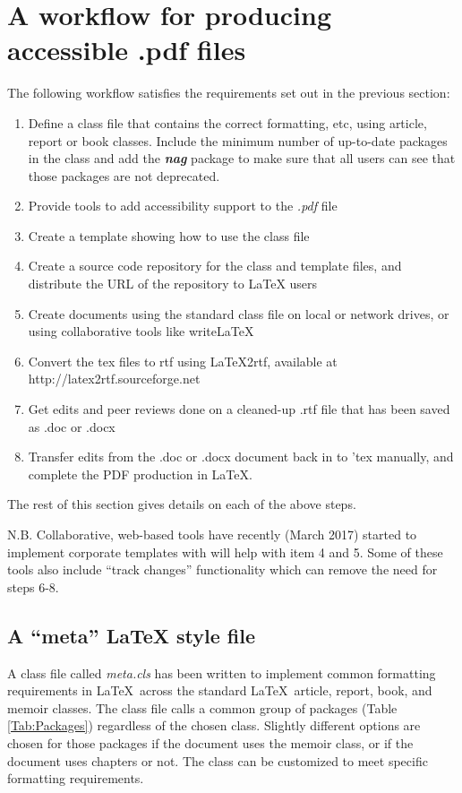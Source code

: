 \documentclass[12pt,letterpaper]{article}
\newcommand{\fn}[1]{\emph{#1}}
\newcommand{\packagename}[1]{\textbf{\emph{#1}}}
\begin{document}
\section{A workflow for producing accessible .pdf files}
The following workflow satisfies the requirements set out in the previous section:
\begin{enumerate}
\item Define a class file that contains the correct formatting, etc, using article, report or book classes. Include the minimum number of up-to-date packages in the class and add the \packagename{nag} package to make sure that all users can see that those packages are not deprecated.
\item Provide tools to add accessibility support to the \fn{.pdf} file
\item Create a template showing how to use the class file
\item Create a source code repository for the class and template files, and distribute the URL of the repository to LaTeX users
\item Create documents using the standard class file on local or network drives, or using collaborative tools like writeLaTeX
\item Convert the tex files to rtf using LaTeX2rtf, available at http://latex2rtf.sourceforge.net
\item Get edits and peer reviews done on a cleaned-up .rtf file that has been saved as .doc or .docx
\item Transfer edits from the .doc or .docx document back in to 'tex manually, and complete the PDF production in LaTeX.
\end{enumerate}

The rest of this section gives details on each of the above steps.

N.B. Collaborative, web-based tools have recently (March 2017) started to implement corporate templates with will help with item 4 and 5. Some of these tools also include ``track changes'' functionality which can remove the need for steps 6-8.

\subsection{A ``meta'' LaTeX style file}\label{sec:meta.cls}
A class file called \fn{meta.cls} has been written to implement common formatting requirements in \LaTeX\ across the standard \LaTeX\ article, report, book, and memoir classes. The class file calls a common group of packages (Table \ref{Tab:Packages}) regardless of the chosen class. Slightly different options are chosen for those packages if the document uses the memoir class, or if the document uses chapters or not. The class can be customized to meet specific formatting requirements. 
\end{document}
